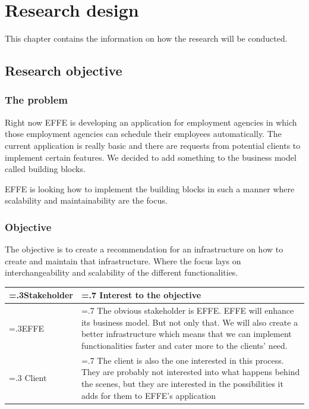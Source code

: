 
\chapter{Research design}
This chapter contains the information on how the research will be conducted.

\section{Research objective}

\subsection{The problem}
\label{sec:TheProblem}

Right now EFFE is developing an application for employment agencies in which those employment agencies can schedule their employees automatically. The current application is really basic and there are requests from potential clients to implement certain features. We decided to add something to the business model called building blocks.


EFFE is looking how to implement the building blocks in such a manner where scalability and maintainability are the focus.

\subsection{Objective}
The objective is to create a recommendation for an infrastructure on how to create and maintain that infrastructure. Where the focus lays on interchangeability and scalability of the different functionalities.

\begin{tabularx}{\linewidth}{|>{\hsize=.3\hsize}X|>{\hsize=.7\hsize}X|}
	\hline
	Stakeholder &
	Interest to the objective
	\\
	\hline
	EFFE &
	The obvious stakeholder is EFFE. EFFE will enhance its business model. But not only that. We will also create a better infrastructure which means that we can implement functionalities faster and cater more to the clients’ need.
	\\
	\hline
	Client &
	The client is also the one interested in this process. They are probably not interested into what happens behind the scenes, but they are interested in the possibilities it adds for them to EFFE’s application
	\\
	\hline
\end{tabularx}

